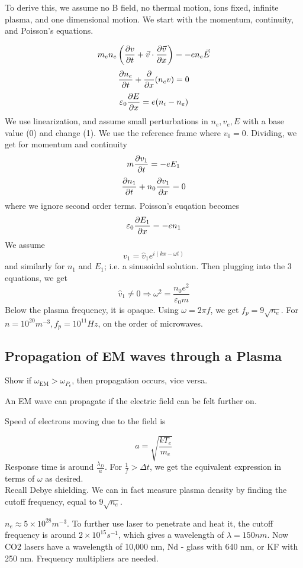 \documentclass[12pt]{article}
\begin{document}
To derive this, we assume no B field, no thermal motion, ions fixed, infinite plasma, and one dimensional motion. We start with the momentum, continuity, and Poisson's equations.

$$m_en_e\left(\frac{\partial v}{\partial t} + \vec v \cdot \frac{\partial \vec v}{\partial x}\right) = -en_e \vec E$$
$$\frac{\partial n_e}{\partial t} + \frac{\partial }{\partial x} (n_ev) = 0$$
$$\varepsilon_0 \frac{\partial E}{\partial x} = e(n_i-n_e)$$
We use linearization, and assume small  perturbations in $n_e,v_e,E$ with a base value (0) and change (1). We use the reference frame where $v_0 = 0$. Dividing, we get for momentum and continuity
$$m\frac{\partial v_1}{\partial t} = -eE_1$$
$$\frac{\partial n_1}{\partial t} + n_0\frac{\partial v_1}{\partial x} = 0$$
where we ignore second order terms. Poisson's euqation becomes
$$\varepsilon_0 \frac{\partial E_1}{\partial x} = -en_1$$
We assume
$$v_1 = \hat v_1 e^{i(kx-\omega t)}$$
and similarly for $n_1$ and $E_1$; i.e. a sinusoidal solution. Then plugging into the 3 equations, we get
$$\hat v_1 \neq 0 \Rightarrow \omega^2 = \frac{n_0e^2}{\varepsilon_0m}$$
Below the plasma frequency, it is opaque. Using $\omega = 2\pi f$, we get $f_p = 9\sqrt{n_e}$. For $n = 10^{20}\unit{m^{-3}}, f_p = 10^{11} \unit{Hz}$, on the order of microwaves.

\subsection{Propagation of EM waves through a Plasma}

Show if $\omega_{\text{EM}} > \omega_{P_e}$, then propagation occurs, vice versa.

\begin{defn}
    An EM wave can propagate if the electric field can be felt further on.
\end{defn}

Speed of electrons moving due to the field is

$$a = \sqrt{\frac{kT_e}{m_e}}$$
Response time is around $\frac{\lambda_D}{a}$. For $\frac{1}{f} > \Delta t$, we get the equivalent expression in terms of $\omega$ as desired. \\

Recall Debye shielding. We can in fact measure plasma density by finding the cutoff frequency, equal to $9\sqrt{n_e}$.

\begin{ex}
    $n_e \approx 5 \times 10^{28} \unit{m^{-3}}$. To further use laser to penetrate and heat it, the cutoff frequency is around $2 \times 10^{15}\unit{s^{-1}}$, which gives a wavelength of $\lambda = 150\unit{nm}$. Now CO2 lasers have a wavelength of 10,000 nm, Nd - glass with 640 nm, or KF with 250 nm. Frequency multipliers are needed.
\end{ex}
\end{document}
